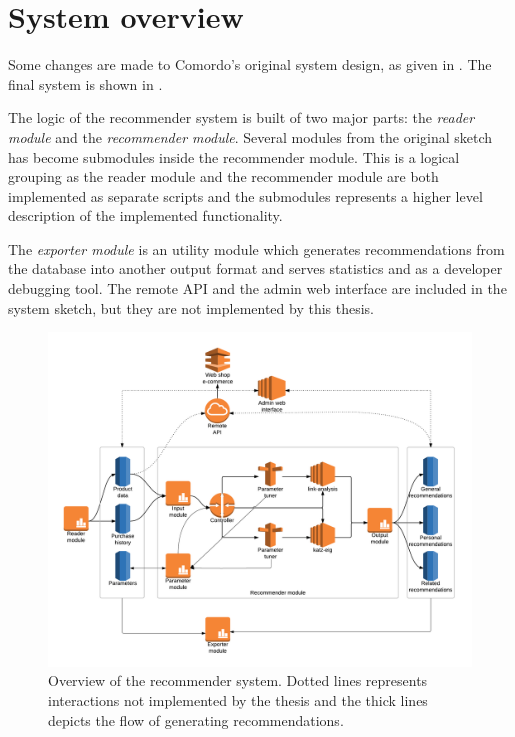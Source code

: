 
\section{System overview}\label{sec:res:sys}

Some changes are made to Comordo's original system design, as given in . The final system is shown in .

The logic of the recommender system is built of two major parts: the \textit{reader module} and the \textit{recommender module}. Several modules from the original sketch has become submodules inside the recommender module. This is a logical grouping as the reader module and the recommender module are both implemented as separate scripts and the submodules represents a higher level description of the implemented functionality. 

The \textit{exporter module} is an utility module which generates recommendations from the database into another output format and serves statistics and as a developer debugging tool.  The remote API and the admin web interface are included in the system sketch, but they are not implemented by this thesis.

\begin{figure}[h!]
  \centering
    \includegraphics[width=1.0\textwidth]{fig/system_overview_final.png}
  \caption{Overview of the recommender system. Dotted lines represents interactions not implemented by the thesis and the thick lines depicts the flow of generating recommendations.}
  \label{fig:sysfinal}
\end{figure}

\FloatBarrier





